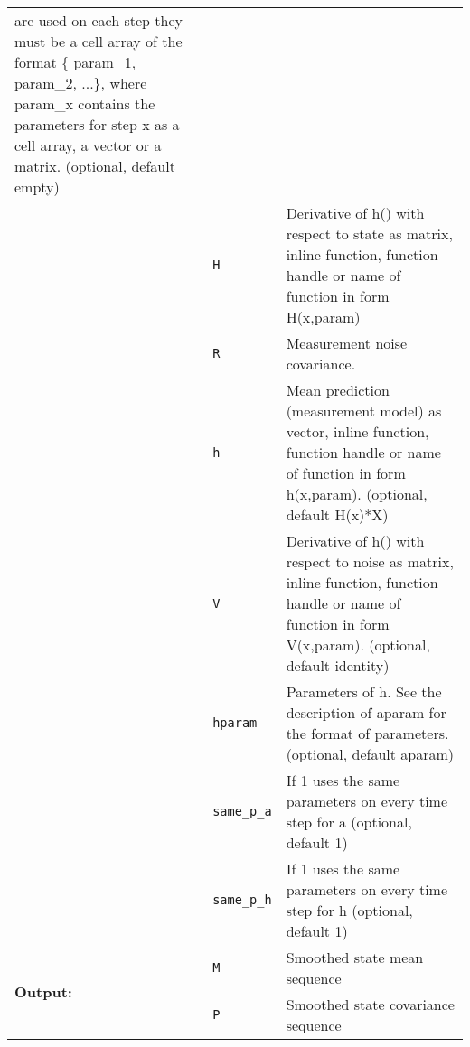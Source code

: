 \begin{tabular*}{\textwidth}{@{\extracolsep{\fill}} | l l p{} |  }
            are used on each step they must be a cell array of the format
            \{ param\_1, param\_2, ...\}, where param\_x contains the parameters for
            step x as a cell array, a vector or a matrix.   (optional, default empty) \\
 & \texttt{H} & Derivative of h() with respect to state as matrix,
         inline function, function handle or name
         of function in form H(x,param) \\
 & \texttt{R} & Measurement noise covariance. \\
 & \texttt{h} & Mean prediction (measurement model) as vector,
         inline function, function handle or name
         of function in form h(x,param).  (optional, default H(x)*X) \\
 & \texttt{V} & Derivative of h() with respect to noise as matrix,
         inline function, function handle or name
         of function in form V(x,param).  (optional, default identity) \\
 & \texttt{hparam} & Parameters of h. See the description of aparam for the format of
              parameters.                  (optional, default aparam) \\
 & \texttt{same\_p\_a} & If 1 uses the same parameters 
               on every time step for a    (optional, default 1)  \\
 & \texttt{same\_p\_h} & If 1 uses the same parameters 
               on every time step for h    (optional, default 1)  \\
\hline
\multirow{2}{*}{\bf Output:}
 & \texttt{M} & Smoothed state mean sequence \\
 & \texttt{P} & Smoothed state covariance sequence
     \\
\hline
\end{tabular*}
